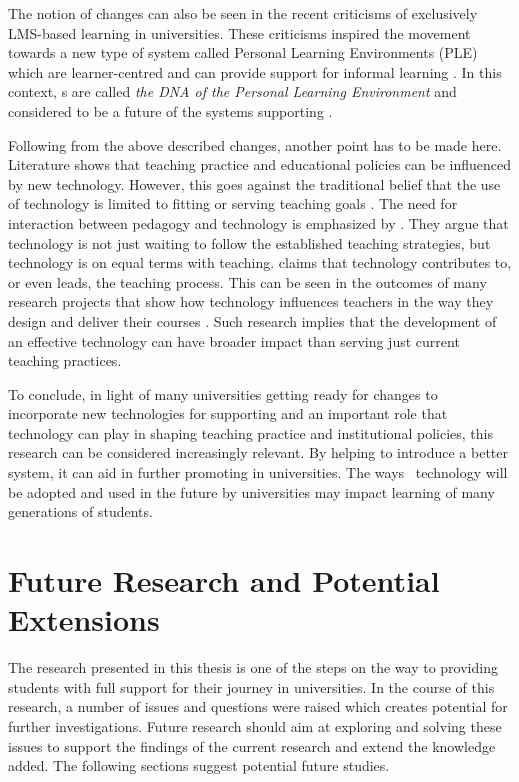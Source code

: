 The notion of changes can also be seen in the recent criticisms of exclusively
LMS-based learning in universities. These criticisms inspired the movement
towards a new type of system called Personal Learning Environments (PLE) which
are learner-centred and can provide support for informal learning
\citep{Calvani2007}. In this context, \ep s are called \textit{the DNA of the
Personal Learning Environment} and considered to be a future of the systems
supporting \LLLs \citep{Attwell2007a}.

Following from the above described changes, another point has to be made here.
Literature shows that teaching practice and educational policies can be
influenced by new technology. However, this goes against the traditional belief
that the use of technology is limited to fitting or serving teaching goals
\citep{Levin2008}. The need for interaction between pedagogy and technology is
emphasized by \citet{Savin-Baden2006}. They argue that technology is not just
waiting to follow the established teaching strategies, but technology is on
equal terms with teaching. \citet{Cousin2005} claims that technology contributes
to, or even leads, the teaching process. This can be seen in the outcomes of
many research projects that show how technology influences teachers in the way
they design and deliver their courses \citep{Rutledge2012,Wang2002}. Such
research implies that the development of an effective technology can have
broader impact than serving just current teaching practices.

To conclude, in light of many universities getting ready for changes to
incorporate new technologies for supporting \LLLs and an important role that
technology can play in shaping teaching practice and institutional policies,
this research can be considered increasingly relevant. By helping to introduce a
better system, it can aid in further promoting \LLLs in universities. The ways
\ep~technology will be adopted and used in the future by universities may impact
learning of many generations of students.

\section{Future Research and Potential Extensions}
The research presented in this thesis is one of the steps on the way to
providing students with full support for their \LLLs journey in universities. In
the course of this research, a number of issues and questions were raised which
creates potential for further investigations. Future research should aim at
exploring and solving these issues to support the findings of the current
research and extend the knowledge added. The following sections suggest
potential future studies.

